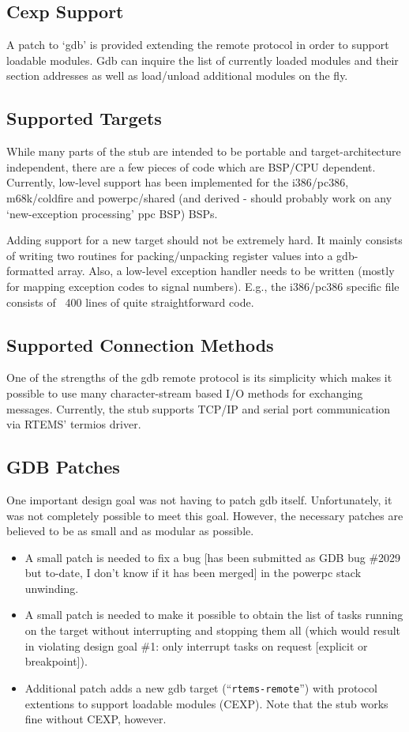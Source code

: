 \documentclass{article}
\newcommand{\cmd}[1]{{\tt #1}}
\begin{document}
\subsection{Cexp Support}
A patch to `gdb' is provided extending the remote protocol
in order to support loadable modules. Gdb can inquire the
list of currently loaded modules and their section addresses
as well as load/unload additional modules on the fly.

\subsection{Supported Targets}
While many parts of the stub are intended to be portable
and target-architecture independent, there are a few pieces of code
which are BSP/CPU dependent. Currently, low-level support
has been implemented for the i386/pc386, m68k/coldfire and
powerpc/shared (and derived - should probably work on any
`new-exception processing' ppc BSP) BSPs.

Adding support for a new target should not be extremely
hard. It mainly consists of writing two routines for
packing/unpacking register values into a gdb-formatted
array. Also, a low-level exception handler needs to be
written (mostly for mapping exception codes to signal numbers).
E.g., the i386/pc386 specific file consists of ~400 lines
of quite straightforward code.

\subsection{Supported Connection Methods}
One of the strengths of the gdb remote protocol is its simplicity
which makes it possible to use many character-stream based
I/O methods for exchanging messages.
Currently, the stub supports TCP/IP and serial port communication
via RTEMS' termios driver.

\subsection{GDB Patches}
One important design goal was not having to patch gdb itself.
Unfortunately, it was not completely possible to meet this
goal. However, the necessary patches are believed to be
as small and as modular as possible.

\begin{itemize}
\item
 A small patch is needed to fix a bug [has been submitted
 as GDB bug \#2029
 but to-date, I don't know if it has been merged] in the
 powerpc stack unwinding.
\item
 A small patch is needed to make it possible to obtain
 the list of tasks running on the target without interrupting
 and stopping them all
 (which would result in violating design goal \#1: only
 interrupt tasks on request [explicit or breakpoint]).
\item
 Additional patch adds a new gdb target (``\cmd{rtems-remote}'')
 with protocol
 extentions to support loadable modules (CEXP). Note that
 the stub works fine without CEXP, however.
\end{itemize}
\end{document}

